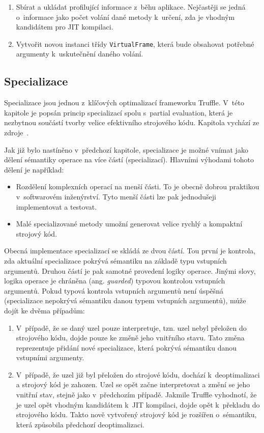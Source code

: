 \documentclass[
  master,
  biblatex,
  figures=true,
  theorems,
  sourcecodes,
  glossaries,
  index
]{kidiplom}
\begin{document}
\begin{enumerate}
    \item Sbírat a ukládat profilující informace z~běhu aplikace. Nejčastěji se jedná o~informace jako počet volání dané metody k~určení, zda je vhodným kandidátem pro JIT kompilaci. 
    \item Vytvořit novou instanci třídy \texttt{VirtualFrame}, která bude obsahovat potřebné argumenty k~uskutečnění daného volání. 
\end{enumerate}

    


\subsection{Specializace}
\label{specialization-chapter}
Specializace jsou jednou z~klíčových optimalizací frameworku Truffle. V~této kapitole je popsán princip specializací spolu s~partial evaluation, která je nezbytnou součástí tvorby velice efektivního strojového kódu. Kapitola vychází ze zdroje~\cite{truffle-dsl-thesis}.

Jak již bylo nastíněno v~předchozí kapitole, specializace je možné vnímat jako dělení sémantiky operace na více částí (specializací). Hlavními výhodami tohoto dělení je například: 

\begin{itemize}
    \item Rozdělení komplexních operací na menší části. To je obecně dobrou praktikou v~softwarovém inženýrství. Tyto menší části lze pak jednodušeji implementovat a testovat. 
    \item Malé specializované metody umožní generovat velice rychlý a kompaktní strojový kód.
\end{itemize}

Obecná implementace specializací se skládá ze dvou částí. Tou první je kontrola, zda aktuální specializace pokrývá sémantiku na základě typu vstupních argumentů. Druhou částí je pak samotné provedení logiky operace. Jinými slovy, logika operace je chráněna (ang. \textit{guarded}) typovou kontrolou vstupních argumentů. Pokud typová kontrola vstupních argumentů není úspěšná (specializace nepokrývá sémantiku danou typem vstupních argumentů), může dojít ke dvěma případům:

\begin{enumerate}
    \item V~případě, že se daný uzel pouze interpretuje, tzn. uzel nebyl přeložen do strojového kódu, dojde pouze ke změně jeho vnitřního stavu. Tato změna reprezentuje přidání nové specializace, která pokrývá sémantiku danou vstupními argumenty. 
    \item V~případě, že uzel již byl přeložen do strojové kódu, dochází k~deoptimalizaci a strojový kód je zahozen. Uzel se opět začne interpretovat a změní se jeho vnitřní stav, stejně jako v~předchozím případě. Jakmile Truffle vyhodnotí, že je uzel opět vhodným kandidátem k~JIT kompilaci, dojde opět k~překladu do strojového kódu. Takto nově vytvořený strojový kód je rozšířen o~sémantiku, která způsobila předchozí deoptimalizaci.
\end{enumerate}
\end{document}
